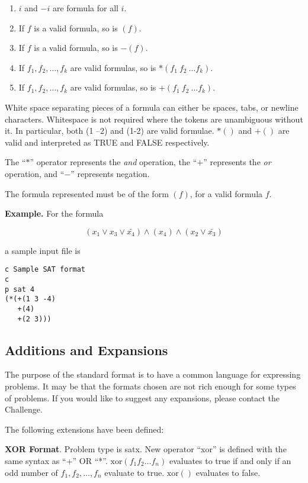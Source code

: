 \begin{enumerate}
\item $i$ and $-i$ are formula for all $i$.
\item If $f$ is a valid formula, so is $(f)$.
\item If $f$ is a valid formula, so is $-(f)$.
\item If $f_1,f_2,\ldots,f_k$ are valid formulas, so is $*(f_1\  f_2\ \ldots f_k)$.
\item If $f_1,f_2,\ldots,f_k$ are valid formulas, so is $+(f_1\  f_2\ \ldots f_k)$.
\end{enumerate}

White space separating pieces of a formula can either be spaces, tabs,
or newline characters.  Whitespace is not required where the tokens
are unambiguous without it.  In particular, both (1 --2) and (1-2) are
valid formulae.  $*()$ and $+()$ are valid and interpreted as TRUE and
FALSE respectively.

The ``$*$'' operator represents the {\it and} operation, the ``$+$''
represents the {\it or} operation, and ``$-$'' represents negation.

The formula represented must be of the form $(f)$, for a valid formula
$f$.

\bigskip
{\bf Example.}  For the formula

$$(x_1\vee x_3\vee \bar{x_4})\wedge (x_4)\wedge (x_2\vee \bar{x_3})$$

\noindent a sample input file is

\begin{verbatim}
c Sample SAT format
c
p sat 4
(*(+(1 3 -4)
   +(4)
   +(2 3)))
\end{verbatim}

\subsection{Additions and Expansions}  The purpose of the standard
format is to have a common language for expressing problems.  It may
be that the formats chosen are not rich enough for some types of
problems.  If you would like to suggest any expansions, please contact
the Challenge.

The following extensions have been defined:

{\bf XOR Format}.  Problem type is satx.  New operator ``xor'' is
defined with the same syntax as ``+'' OR ``*''.  $\mbox{xor}(f_1 f_2
\ldots f_n)$ evaluates to true if and only if an odd number of $f_1,
f_2,\ldots, f_n$ evaluate to true.  $\mbox{xor}()$ evaluates to false.


